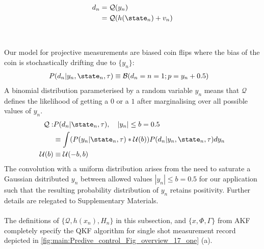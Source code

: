 \begin{align}
d_n &= \mathcal{Q}(y_n)\\
&=  \mathcal{Q}(h(\state_n) + v_n)
\end{align}
\\
\\ 
Our model for projective measurements are biased coin flips where the bias of the coin is stochastically drifting due to $\{ y_n\}$:
\begin{align}
P(d_n | y_n, \state_{n}, \tau) & \equiv \mathcal{B}(d_n=n=1;p= y_n + 0.5 ) 
\end{align}
A binomial distribution parameterised by a random variable $y_n$ means that $\mathcal{Q}$ defines the likelihood of getting a $0$ or a $1$ after marginalising over all possible values of $y_n$.  
\begin{align}
\mathcal{Q}: & P(d_n | \state_{n}, \tau), \quad |y_n| \leq b = 0.5\\
& \equiv  \int (P(y_n | \state_{n}, \tau) * \mathcal{U}(b) ) P(d_n | y_n, \state_{n}, \tau) dy_n \\
\mathcal{U}(b) & \equiv \mathcal{U}(-b, b)
\end{align}
The convolution with a uniform distribution arises from the need to saturate a Gaussian dsitributed  $y_n$ between allowed values $|y_n| \leq b = 0.5$ for our application such that the resulting probability distribution of $y_n$ retains positivity. Further details are relegated to Supplementary Materials. 
\\
\\
The definitions of $\{ \mathcal{Q}, h(x_n), H_n \}$ in this subsection, and $\{x, \Phi, \Gamma\}$ from AKF completely specify the QKF algorithm for single shot measurement record depicted in \cref{fig:main:Predive_control_Fig_overview_17_one} (a). 
\\
\\
